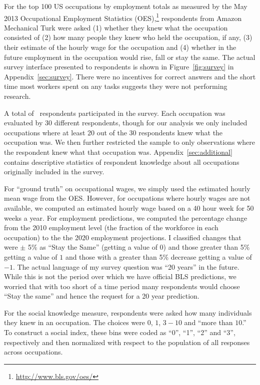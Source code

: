 \documentclass[12pt]{article}
\newcommand{\qu}[1]{``#1''}
\begin{document}
For the top 100 US occupations by employment totals as measured by the May 2013 Occupational Employment Statistics (OES),\footnote{\url{http://www.bls.gov/oes/}}  respondents from Amazon Mechanical Turk were asked
(1) whether they knew what the occupation consisted of 
(2) how many people they knew who held the occupation, if any,  
(3) their estimate of the hourly wage for the occupation
and (4) whether in the future employment in the occupation would rise, fall or stay the same.
The actual survey interface presented to respondents is shown in Figure~\ref{fig:survey} in Appendix~\ref{sec:survey}. 
There were no incentives for correct answers and the short time most workers spent on any tasks suggests they were not performing research. 

A total of \numRaters\, respondents participated in the survey. 
Each occupation was evaluated by 30 different respondents, though for our analysis we only included occupations where at least 20 out of the 30 respondents knew what the occupation was.
We then further restricted the sample to only observations where the respondent knew what that occupation was. %
Appendix~\ref{sec:additional} contains descriptive statistics of respondent knowledge about all occupations originally included in the survey.   

For ``ground truth'' on occupational wages, we simply used the estimated hourly mean wage from the OES.
However, for occupations where hourly wages are not available, we computed an estimated hourly wage based on a 40 hour week for 50 weeks a year.  
For employment predictions, we computed the percentage change from the 2010 employment level (the fraction of the workforce in each occupation) to the the 2020 employment projections. 
I classified changes that were $\pm$ 5\% as ``Stay the Same'' (getting a value of $0$) and those greater than 5\% getting a value of $1$ and those with a greater than 5\% decrease getting a value of $-1$.  
The actual language of my survey question was ``20 years'' in the future. 
While this is not the period over which we have official BLS predictions, we worried that with too short of a time period many respondents would choose ``Stay the same'' and hence the request for a 20 year prediction. %

For the social knowledge measure, respondents were asked how many individuals they knew in an occupation. 
The choices were $0$, $1$, $3-10$ and \qu{more than $10$.} 
To construct a social index, these bins were coded as ``0'', ``1'', ``2'' and ``3'', respectively and then normalized with respect to the population of all responses across occupations.
\end{document}
